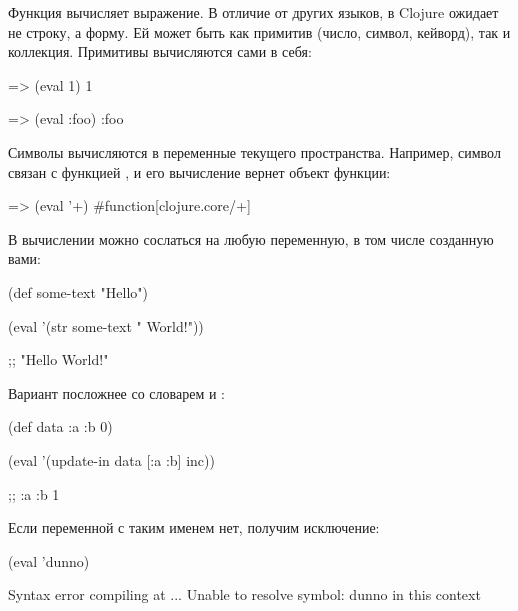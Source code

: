 Функция  вычисляет выражение. В отличие от других языков, в Clojure  ожидает не строку, а форму. Ей может быть как примитив (число, символ, кейворд), так и коллекция. Примитивы вычисляются сами в себя:

\begin{english}
  \begin{clojure}
=> (eval 1)
1

=> (eval :foo)
:foo
  \end{clojure}
\end{english}
Символы вычисляются в переменные текущего пространства. Например, символ \code{+}
связан с функцией , и его вычисление вернет объект функции:

\begin{english}
  \begin{clojure}
=> (eval '+)
#function[clojure.core/+]
  \end{clojure}
\end{english}

В вычислении можно сослаться на любую переменную, в том числе созданную вами:

\begin{english}
  \begin{clojure}
(def some-text "Hello")

(eval '(str some-text " World!"))

;; "Hello World!"
  \end{clojure}
\end{english}

Вариант посложнее со словарем и :

\begin{english}
  \begin{clojure}
(def data {:a {:b 0}})

(eval '(update-in data [:a :b] inc))

;; {:a {:b 1}}
  \end{clojure}
\end{english}

Если переменной с таким именем нет, получим исключение:

\begin{english}
  \begin{clojure}
(eval 'dunno)

Syntax error compiling at ...
Unable to resolve symbol: dunno in this context
  \end{clojure}
\end{english}


